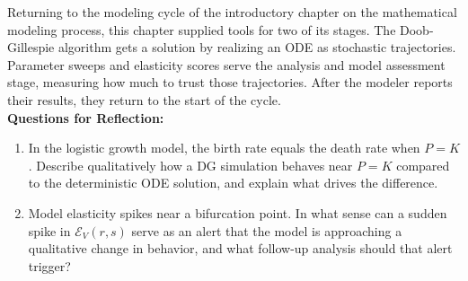 Returning to the modeling cycle of the introductory chapter on the mathematical modeling process, this chapter supplied tools for two of its stages. The Doob-Gillespie algorithm gets a solution by realizing an ODE as stochastic trajectories. Parameter sweeps and elasticity scores serve the analysis and model assessment stage, measuring how much to trust those trajectories. After the modeler reports their results, they return to the start of the cycle.\\

\noindent \textup{{\bf Questions for Reflection:}}
\begin{enumerate}
\item In the logistic growth model, the birth rate equals the death rate when $P = K$. Describe qualitatively how a DG simulation behaves near $P = K$ compared to the deterministic ODE solution, and explain what drives the difference.

\item Model elasticity spikes near a bifurcation point. In what sense can a sudden spike in $\mathcal{E}_V(r,s)$ serve as an alert that the model is approaching a qualitative change in behavior, and what follow-up analysis should that alert trigger?
\end{enumerate}

